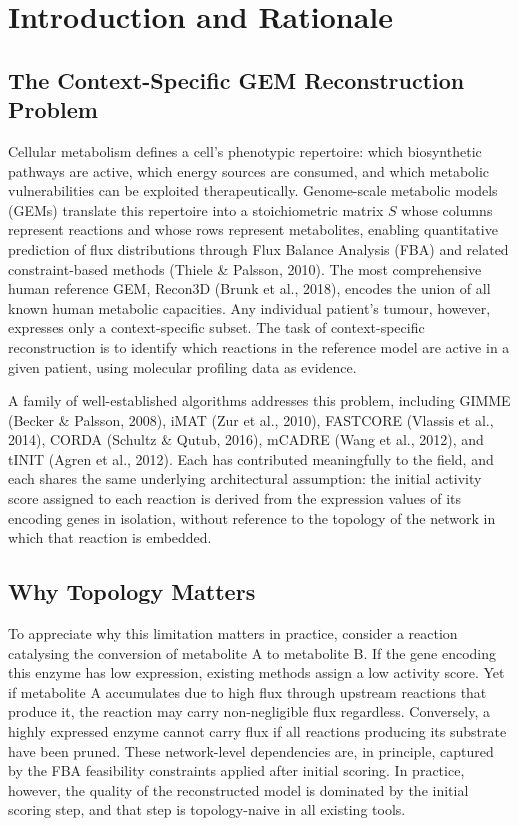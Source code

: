 \documentclass[12pt,a4paper]{article}
\begin{document}
\section{Introduction and Rationale}

\subsection{The Context-Specific GEM Reconstruction Problem}

Cellular metabolism defines a cell's phenotypic repertoire: which biosynthetic pathways are active, which energy sources are consumed, and which metabolic vulnerabilities can be exploited therapeutically. Genome-scale metabolic models (GEMs) translate this repertoire into a stoichiometric matrix $S$ whose columns represent reactions and whose rows represent metabolites, enabling quantitative prediction of flux distributions through Flux Balance Analysis (FBA) and related constraint-based methods (Thiele \& Palsson, 2010). The most comprehensive human reference GEM, Recon3D (Brunk et al., 2018), encodes the union of all known human metabolic capacities. Any individual patient's tumour, however, expresses only a context-specific subset. The task of context-specific reconstruction is to identify which reactions in the reference model are active in a given patient, using molecular profiling data as evidence.

A family of well-established algorithms addresses this problem, including GIMME (Becker \& Palsson, 2008), iMAT (Zur et al., 2010), FASTCORE (Vlassis et al., 2014), CORDA (Schultz \& Qutub, 2016), mCADRE (Wang et al., 2012), and tINIT (Agren et al., 2012). Each has contributed meaningfully to the field, and each shares the same underlying architectural assumption: the initial activity score assigned to each reaction is derived from the expression values of its encoding genes in isolation, without reference to the topology of the network in which that reaction is embedded.

\subsection{Why Topology Matters}

To appreciate why this limitation matters in practice, consider a reaction catalysing the conversion of metabolite A to metabolite B. If the gene encoding this enzyme has low expression, existing methods assign a low activity score. Yet if metabolite A accumulates due to high flux through upstream reactions that produce it, the reaction may carry non-negligible flux regardless. Conversely, a highly expressed enzyme cannot carry flux if all reactions producing its substrate have been pruned. These network-level dependencies are, in principle, captured by the FBA feasibility constraints applied after initial scoring. In practice, however, the quality of the reconstructed model is dominated by the initial scoring step, and that step is topology-naive in all existing tools.
\end{document}
